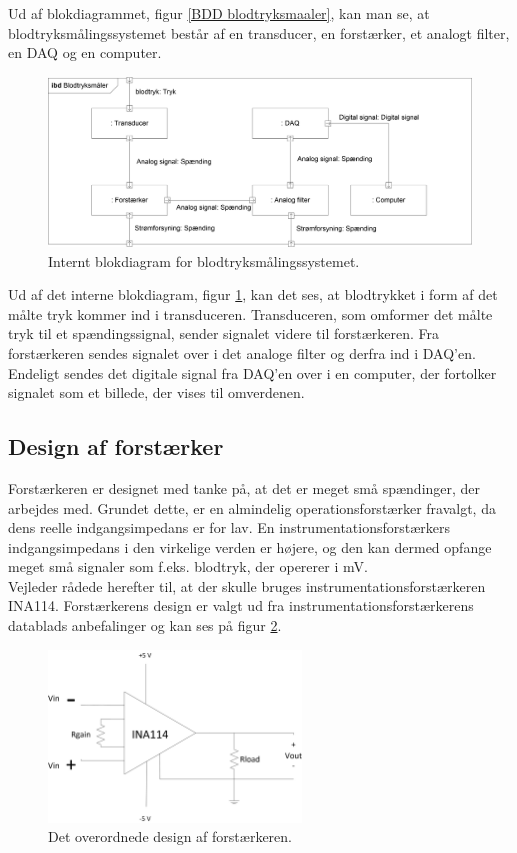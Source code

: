 Ud af blokdiagrammet, figur \ref{BDD blodtryksmaaler}, kan man se, at blodtryksmålingssystemet består af en transducer, en forstærker, et analogt filter, en DAQ og en computer.\\
\begin{figure}[H]
	\centering
	\includegraphics[width=1\textwidth]{Figurer/Hardware/IBD}
	\caption{Internt blokdiagram for blodtryksmålingssystemet.}
	\label{IBD blodtryksmaaler}
\end{figure}

Ud af det interne blokdiagram, figur \ref{IBD blodtryksmaaler}, kan det ses, at blodtrykket i form af det målte tryk kommer ind i transduceren. Transduceren, som omformer det målte tryk til et spændingssignal, sender signalet videre til forstærkeren. Fra forstærkeren sendes signalet over i det analoge filter og derfra ind i DAQ'en. Endeligt sendes det digitale signal fra DAQ'en over i en computer, der fortolker signalet som et billede, der vises til omverdenen.

\subsection{Design af forstærker}
Forstærkeren er designet med tanke på, at det er meget små spændinger, der arbejdes med. Grundet dette, er en almindelig operationsforstærker fravalgt, da dens reelle indgangsimpedans er for lav. En instrumentationsforstærkers indgangsimpedans i den virkelige verden er højere, og den kan dermed opfange meget små signaler som f.eks. blodtryk, der opererer i mV.\\
Vejleder rådede herefter til, at der skulle bruges instrumentationsforstærkeren INA114. Forstærkerens design er valgt ud fra instrumentationsforstærkerens datablads anbefalinger og kan ses på figur \ref{instrumentation}.\\ 
\begin{figure}[H]
	\centering
	\includegraphics[width=0.6\textwidth]{Figurer/Hardware/Forstaerker}
	\caption{Det overordnede design af forstærkeren.}\label{instrumentation}
\end{figure}



